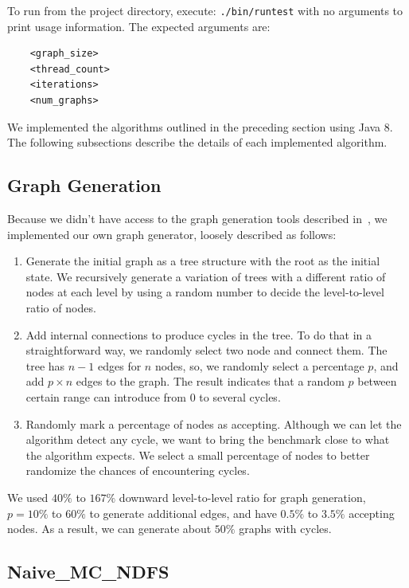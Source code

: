 \documentclass[a4paper]{article}
\begin{document}
To run from the project directory, execute: \texttt{./bin/runtest} with no arguments to print usage information. The expected arguments are:

\begin{verbatim}
    <graph_size>
    <thread_count>
    <iterations>
    <num_graphs>
\end{verbatim}

We implemented the algorithms outlined in the preceding section using Java 8. The following subsections describe the details of each implemented algorithm.


\subsection{Graph Generation}

Because we didn't have access to the graph generation tools described in~\cite{laarman}, we implemented our own graph generator, loosely described as follows:

\begin{enumerate}
    \item Generate the initial graph as a tree structure with the root as the initial
        state. We recursively generate a variation of trees with a different ratio of
        nodes at each level by using a random number to decide the level-to-level ratio of nodes.  
    \item Add internal connections to produce cycles in the tree. To do that in a straightforward way,
        we randomly select two node and connect them. 
        The tree has $n-1$ edges for $n$ nodes, so, we randomly select a percentage $p$,
        and add $p\times n$ edges to the graph. The result indicates that a random $p$ between
        certain range can introduce from 0 to several cycles.
    \item Randomly mark a percentage of nodes as accepting.
        Although we can let the algorithm detect any cycle, we want to bring the benchmark close to what the algorithm expects. We select a small percentage of nodes to better randomize the chances of
        encountering cycles.
    
\end{enumerate}
    We used $40\%$ to $167\%$ downward level-to-level ratio for graph generation,
     $p = 10\%$ to $60\%$ to generate additional edges,
    and have $0.5\%$ to $3.5\%$ accepting nodes.
    As a result, we can generate about $50\%$ graphs with cycles.


\subsection{Naive\_MC\_NDFS}
\end{document}

